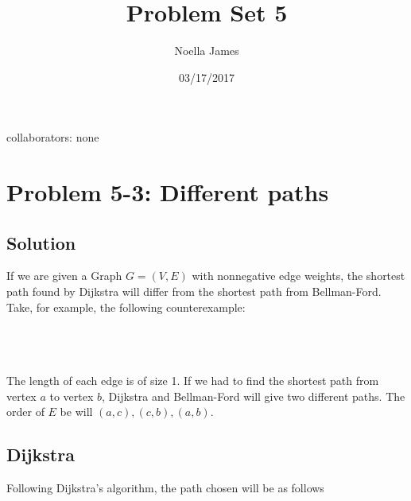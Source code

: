 \documentclass{article}
\theoremstyle{definition}
\theoremstyle{remark}
\theoremstyle{plain}
\begin{document}
\title{Problem Set 5}
\date{03/17/2017}
\author{Noella James}
\maketitle
collaborators: none\\

\section*{Problem 5-3: Different paths}

\subsection*{Solution}
If we are given a Graph $G = (V,E)$ with nonnegative edge weights, the shortest path found by Dijkstra will differ from the shortest path from Bellman-Ford. Take, for example, the following counterexample:\\


\\\\
 \\The length of each edge is of size 1. If we had to find the shortest path from vertex $a$ to vertex $b$,  Dijkstra and Bellman-Ford will give two different paths. The order of $E$  be will $(a, c), (c,b), (a,b)$.
 
 \subsection*{Dijkstra}
 Following Dijkstra's algorithm, the path chosen will be as follows
 
\end{document}

